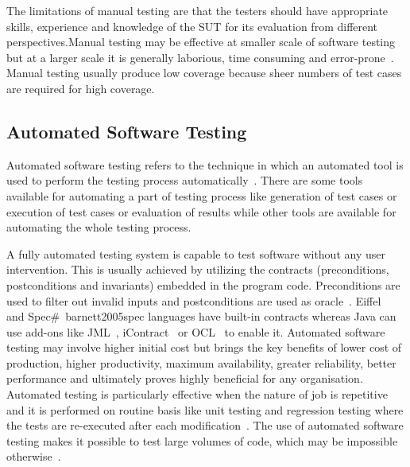 The limitations of manual testing are that the testers should have appropriate skills, experience and knowledge of the SUT for its evaluation from different perspectives.Manual testing may be effective at smaller scale of software testing but at a larger scale it is generally laborious, time consuming and error-prone~\cite{tretmans2000automatic}. Manual testing usually produce low coverage because sheer numbers of test cases are required for high coverage.


 
\subsection{Automated Software Testing}
Automated software testing refers to the technique in which an automated tool is used to perform the testing process automatically~\cite{leitner2007reconciling}. There are some tools available for automating a part of testing process like generation of test cases or execution of test cases or evaluation of results while other tools are available for automating the whole testing process. 

A fully automated testing system is capable to test software without any user intervention. This is usually achieved by utilizing the contracts (preconditions, postconditions and invariants) embedded in the program code. Preconditions are used to filter out invalid inputs and postconditions are used as oracle~\cite{leitner2007reconciling}. Eiffel~\cite{ecma2005367} and Spec\#~{barnett2005spec} languages have built-in contracts whereas Java can use add-ons like JML~\cite{leavensjml}, iContract~\cite{kramer1998icontract} or OCL~\cite{richters1998formalizing} to enable it. 
Automated software testing may involve higher initial cost but brings the key benefits of lower cost of production, higher productivity, maximum availability, greater reliability, better performance and ultimately proves highly beneficial for any organisation. Automated testing is particularly effective when the nature of job is repetitive and it is performed on routine basis like unit testing and regression testing where the tests are re-executed after each modification~\cite{huang2003automated}. The use of automated software testing makes it possible to test large volumes of code, which may be impossible otherwise~\cite{ramamoorthy1975testing}.
\newpage
